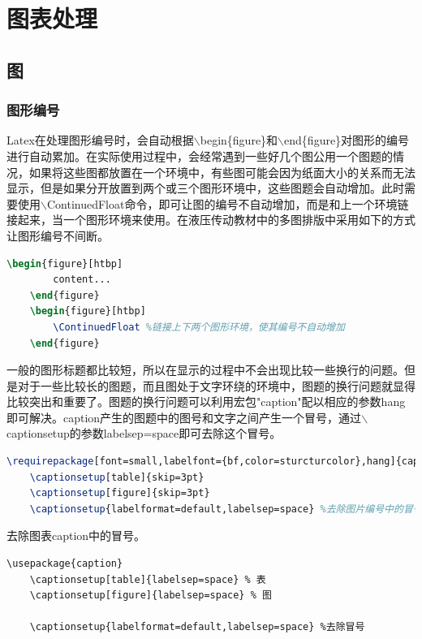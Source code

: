 \documentclass[12pt]{book}
\begin{document}
\chapter{图表处理}

\section{图}

\subsection{图形编号}

Latex在处理图形编号时，会自动根据$\backslash$begin\{figure\}和$\backslash$end\{figure\}对图形的编号进行自动累加。在实际使用过程中，会经常遇到一些好几个图公用一个图题的情况，如果将这些图都放置在一个环境中，有些图可能会因为纸面大小的关系而无法显示，但是如果分开放置到两个或三个图形环境中，这些图题会自动增加。此时需要使用$\backslash$ContinuedFloat命令，即可让图的编号不自动增加，而是和上一个环境链接起来，当一个图形环境来使用。在液压传动教材中的多图排版中采用如下的方式让图形编号不间断。
\begin{lstlisting}[language=tex,breaklines]
	\begin{figure}[htbp]
		content...
	\end{figure}	
	\begin{figure}[htbp]
		\ContinuedFloat %链接上下两个图形环境，使其编号不自动增加
	\end{figure}
\end{lstlisting}

一般的图形标题都比较短，所以在显示的过程中不会出现比较一些换行的问题。但是对于一些比较长的图题，而且图处于文字环绕的环境中，图题的换行问题就显得比较突出和重要了。图题的换行问题可以利用宏包"caption"配以相应的参数hang即可解决。caption产生的图题中的图号和文字之间产生一个冒号，通过$\backslash$captionsetup的参数labelsep=space即可去除这个冒号。
\begin{lstlisting}[language=tex,breaklines]
	\requirepackage[font=small,labelfont={bf,color=sturcturcolor},hang]{caption} %hang解决了图题过长时的自动换行问题
	\captionsetup[table]{skip=3pt}
	\captionsetup[figure]{skip=3pt}
	\captionsetup{labelformat=default,labelsep=space} %去除图片编号中的冒号
\end{lstlisting}

去除图表caption中的冒号。
\begin{lstlisting}[breaklines]
	\usepackage{caption}
	\captionsetup[table]{labelsep=space} % 表
	\captionsetup[figure]{labelsep=space} % 图
	
	\captionsetup{labelformat=default,labelsep=space} %去除冒号
\end{lstlisting}
  
\end{document}
